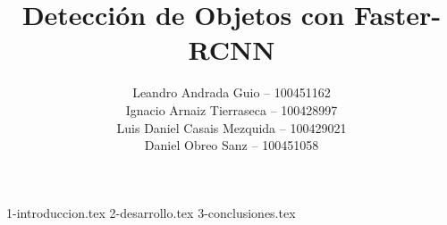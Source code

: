 \documentclass[es]{uc3mreport}
\author{
  Leandro Andrada Guio -- 100451162\\
  Ignacio Arnaiz Tierraseca -- 100428997\\
  Luis Daniel Casais Mezquida -- 100429021\\
  Daniel Obreo Sanz -- 100451058
}
\title{Detección de Objetos con Faster-RCNN}
\begin{document}
  \makecover[old]

  \begin{report}
    {1-introduccion.tex}
    {2-desarrollo.tex}
    {3-conclusiones.tex}
  \end{report}
\end{document}
